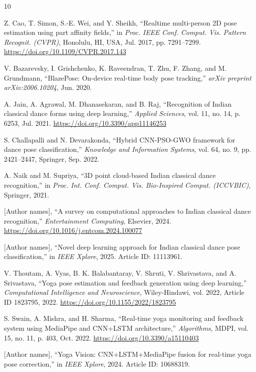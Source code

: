 \documentclass[journal]{IEEEtran}
\begin{document}
\begin{thebibliography}{10}

Z. Cao, T. Simon, S.-E. Wei, and Y. Sheikh,
``Realtime multi-person 2D pose estimation using part affinity fields,''
in \textit{Proc. IEEE Conf. Comput. Vis. Pattern Recognit. (CVPR)},
Honolulu, HI, USA, Jul. 2017, pp. 7291--7299.
\url{https://doi.org/10.1109/CVPR.2017.143}

V. Bazarevsky, I. Grishchenko, K. Raveendran, T. Zhu, F. Zhang,
and M. Grundmann,
``BlazePose: On-device real-time body pose tracking,''
\textit{arXiv preprint arXiv:2006.10204}, Jun. 2020.

A. Jain, A. Agrawal, M. Dhanasekaran, and B. Raj,
``Recognition of Indian classical dance forms using deep learning,''
\textit{Applied Sciences}, vol. 11, no. 14, p. 6253, Jul. 2021.
\url{https://doi.org/10.3390/app11146253}

S. Challapalli and N. Devarakonda,
``Hybrid CNN-PSO-GWO framework for dance pose classification,''
\textit{Knowledge and Information Systems}, vol. 64, no. 9,
pp. 2421--2447, Springer, Sep. 2022.

A. Naik and M. Supriya,
``3D point cloud-based Indian classical dance recognition,''
in \textit{Proc. Int. Conf. Comput. Vis. Bio-Inspired Comput. (ICCVBIC)},
Springer, 2021.

[Author names],
``A survey on computational approaches to Indian classical dance
recognition,''
\textit{Entertainment Computing}, Elsevier, 2024.
\url{https://doi.org/10.1016/j.entcom.2024.100077}

[Author names],
``Novel deep learning approach for Indian classical dance pose
classification,''
in \textit{IEEE Xplore}, 2025. Article ID: 11113961.

V. Thoutam, A. Vyas, B. K. Balabantaray, V. Shruti, V. Shrivastava,
and A. Srivastava,
``Yoga pose estimation and feedback generation using deep learning,''
\textit{Computational Intelligence and Neuroscience},
Wiley-Hindawi, vol. 2022, Article ID 1823795, 2022.
\url{https://doi.org/10.1155/2022/1823795}

S. Swain, A. Mishra, and H. Sharma,
``Real-time yoga monitoring and feedback system using MediaPipe and
CNN+LSTM architecture,''
\textit{Algorithms}, MDPI, vol. 15, no. 11, p. 403, Oct. 2022.
\url{https://doi.org/10.3390/a15110403}

[Author names],
``Yoga Vision: CNN+LSTM+MediaPipe fusion for real-time yoga pose
correction,''
in \textit{IEEE Xplore}, 2024. Article ID: 10688319.

\end{thebibliography}
\end{document}
